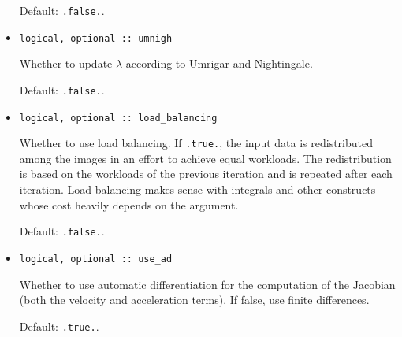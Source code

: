 \documentclass{article}
\begin{document}
\begin{itemize}
  Default: \texttt{.false.}.
\item
\begin{verbatim}
logical, optional :: umnigh
\end{verbatim}
  Whether to update $\lambda$ according to Umrigar and Nightingale.

  Default: \texttt{.false.}.
\item
\begin{verbatim}
logical, optional :: load_balancing
\end{verbatim}
  Whether to use load balancing. If \verb+.true.+, the input data is redistributed among the images in an effort to achieve equal workloads. The redistribution is based on the workloads of the previous iteration and is repeated after each iteration. Load balancing makes sense with integrals and other constructs whose cost heavily depends on the argument.

  Default: \verb+.false.+.
\item
\begin{verbatim}
logical, optional :: use_ad
\end{verbatim}
  Whether to use automatic differentiation for the computation of the Jacobian (both the velocity and acceleration terms). If false, use finite differences.

  Default: \verb+.true.+.
\end{itemize}
\end{document}
